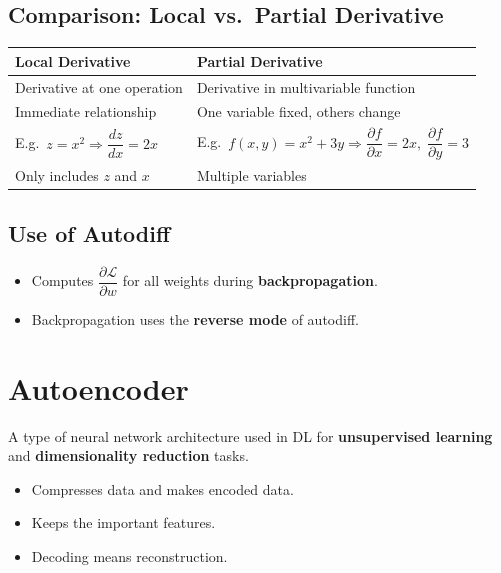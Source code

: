 \documentclass[12pt,a4paper]{article}
\begin{document}
\subsection{Comparison: Local vs.\ Partial Derivative}

\begin{center}
\begin{tabular}{p{6cm}p{6cm}}
\toprule
\textbf{Local Derivative} & \textbf{Partial Derivative} \\
\midrule
Derivative at one operation & Derivative in multivariable function \\
Immediate relationship & One variable fixed, others change \\
E.g.\ $z = x^2 \Rightarrow \dfrac{dz}{dx} = 2x$ & E.g.\ $f(x,y) = x^2 + 3y \Rightarrow \dfrac{\partial f}{\partial x} = 2x,\; \dfrac{\partial f}{\partial y} = 3$ \\
Only includes $z$ and $x$ & Multiple variables \\
\bottomrule
\end{tabular}
\end{center}

\subsection{Use of Autodiff}
\begin{itemize}
  \item Computes $\dfrac{\partial \mathcal{L}}{\partial w}$ for all weights during \textbf{backpropagation}.
  \item Backpropagation uses the \textbf{reverse mode} of autodiff.
\end{itemize}

\section{Autoencoder}

\begin{definitionbox}[Autoencoder]
A type of neural network architecture used in DL for \textbf{unsupervised learning} and \textbf{dimensionality reduction} tasks.
\begin{itemize}
  \item Compresses data and makes encoded data.
  \item Keeps the important features.
  \item Decoding means reconstruction.
\end{itemize}
\end{definitionbox}
\end{document}
